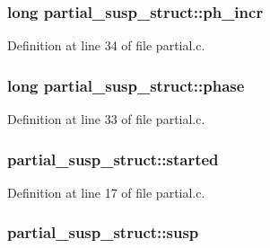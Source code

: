 \subsubsection[{\texorpdfstring{ph\+\_\+incr}{ph_incr}}]{\setlength{\rightskip}{0pt plus 5cm}long partial\+\_\+susp\+\_\+struct\+::ph\+\_\+incr}\hypertarget{structpartial__susp__struct_a1057f1c4b7ab9179c9b1852110a58356}{}\label{structpartial__susp__struct_a1057f1c4b7ab9179c9b1852110a58356}


Definition at line 34 of file partial.\+c.

\subsubsection[{\texorpdfstring{phase}{phase}}]{\setlength{\rightskip}{0pt plus 5cm}long partial\+\_\+susp\+\_\+struct\+::phase}\hypertarget{structpartial__susp__struct_a643538e666d21828691b39e12f52c9bc}{}\label{structpartial__susp__struct_a643538e666d21828691b39e12f52c9bc}


Definition at line 33 of file partial.\+c.

\subsubsection[{\texorpdfstring{started}{started}}]{ partial\+\_\+susp\+\_\+struct\+::started}\hypertarget{structpartial__susp__struct_a473ea2fccd7be094ff4216e88baa22f5}{}\label{structpartial__susp__struct_a473ea2fccd7be094ff4216e88baa22f5}


Definition at line 17 of file partial.\+c.

\subsubsection[{\texorpdfstring{susp}{susp}}]{ partial\+\_\+susp\+\_\+struct\+::susp}\hypertarget{structpartial__susp__struct_abae80401486137fab1d874ce24107df5}{}\label{structpartial__susp__struct_abae80401486137fab1d874ce24107df5}


